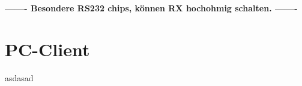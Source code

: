 \textbf{------- Besondere RS232 chips, können RX hochohmig schalten. -------}



\newpage



\newpage
\section{PC-Client}
\label{section_Verwaltung}
asdasad

\newpage



\newpage


